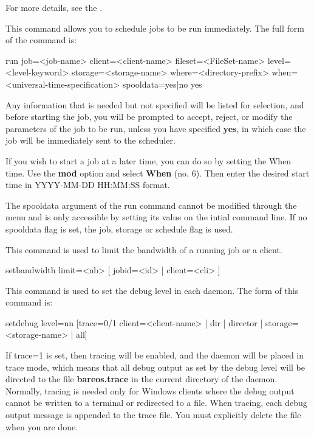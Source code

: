 \begin{description}
{    For more details, see the .

\item [run]
   This command allows you to schedule jobs  to be run immediately. The full form
   of the command is:

run job={\textless}job-name{\textgreater} client={\textless}client-name{\textgreater}
  fileset={\textless}FileSet-name{\textgreater}  level={\textless}level-keyword{\textgreater}
  storage={\textless}storage-name{\textgreater}  where={\textless}directory-prefix{\textgreater}
  when={\textless}universal-time-specification{\textgreater} spooldata=yes|no yes

   Any information that is needed but not specified will be listed for
   selection, and before starting the job, you will be prompted to accept,
   reject, or modify the parameters of the job to be run, unless you have
   specified {\bf yes}, in which case the job will be immediately sent to
   the scheduler.

   If you wish to start a job at a later time, you can do so by setting  the When
   time. Use the {\bf mod} option and select {\bf When} (no. 6).  Then enter the
   desired start time in YYYY-MM-DD HH:MM:SS format.

   The spooldata argument of the run command cannot be modified through the menu
   and is only accessible by setting its value on the intial command line. If
   no spooldata flag is set, the job, storage or schedule flag is used.

\item[setbandwidth]
  This command is used to limit the bandwidth of a running job or a client.

setbandwidth limit=<nb> [ jobid=<id> | client=<cli> ]

\item [setdebug]
   This command is used to set the debug level in each  daemon. The form of this
   command is:

setdebug level=nn [trace=0/1 client={\textless}client-name{\textgreater} | dir | director |
  storage={\textless}storage-name{\textgreater} | all]

   If trace=1 is set, then tracing will be enabled, and the daemon will be
   placed in trace mode, which means that all debug output as set by the
   debug level will be directed to the file {\bf bareos.trace} in the
   current directory of the daemon.  Normally, tracing is needed only for
   Windows clients where the debug output cannot be written to a terminal or
   redirected to a file.  When tracing, each debug output message is
   appended to the trace file.  You must explicitly delete the file when
   you are done.

}
\end{description}
